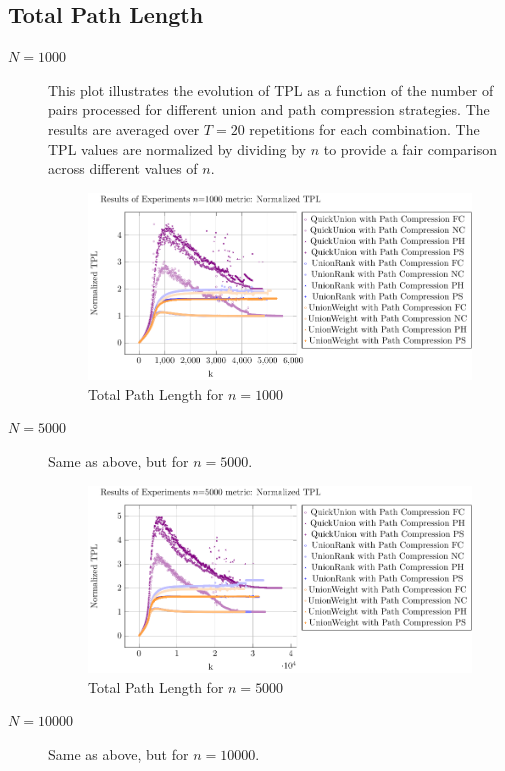 \documentclass[10pt,a4paper,hidelinks]{article}
\begin{document}
\subsection{Total Path Length}
\begin{description}
    \item[$N = 1000$] This plot illustrates the evolution of TPL as a function of the number of pairs processed for different union and path compression strategies. The results are averaged over $T=20$ repetitions for each combination. The TPL values are normalized by dividing by $n$ to provide a fair comparison across different values of $n$.
    \begin{figure}[h]
        \centering
        \includegraphics[width=\linewidth]{plots/plot_1000_Normalized TPL.pdf}
        \caption{Total Path Length for $n = 1000$}
    \end{figure}
    \item[$N = 5000$] Same as above, but for $n = 5000$.
    \begin{figure}[h]
        \centering
        \includegraphics[width=\linewidth]{plots/plot_5000_Normalized TPL.pdf}
        \caption{Total Path Length for $n = 5000$}
    \end{figure}
    \item[$N = 10000$] Same as above, but for $n = 10000$.

\end{description}
\end{document}
